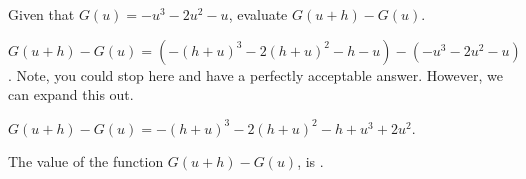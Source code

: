 \begin{shuffle}
\begin{exercise}
Given that $G(u)=-u^3-2 u^2-u$, evaluate $G(u+h)-G(u)$.
\begin{solution}
\begin{hint}
$G(u+h)-G(u)=(-(h+u)^3-2 (h+u)^2-h-u)-(-u^3-2 u^2-u)$. Note, you could stop here and have a perfectly acceptable answer. However, we can expand this out.
\end{hint}
\begin{hint}
$G(u+h)-G(u)=-(h+u)^3-2 (h+u)^2-h+u^3+2 u^2$.
\end{hint}
The value of the function $G(u+h)-G(u)$, is .
\end{solution}
\end{exercise}


\end{shuffle}



